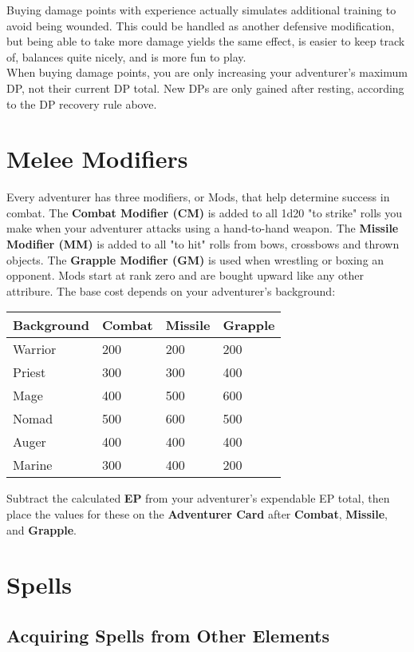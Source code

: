 \begin{multicols}{2}
Buying damage points with experience actually simulates additional training to avoid being wounded. This could be handled as another defensive modification, but being able to take more damage yields the same effect, is easier to keep track of, balances quite nicely, and is more fun to play.\\
When buying damage points, you are only increasing your adventurer’s maximum DP, not their current DP total. New DPs are only gained after resting, according to the DP recovery rule above.
\section{Melee Modifiers}
Every adventurer has three modifiers, or Mods, that help determine success in combat. The \textbf{Combat Modifier (CM)} is added to all 1d20 "to strike" rolls you make when
your adventurer attacks using a hand-to-hand weapon. The \textbf{Missile Modifier (MM)} is added to all "to hit" rolls from bows, crossbows and thrown objects. The \textbf{Grapple Modifier (GM)} is used when wrestling or boxing an opponent. Mods start at rank zero and are bought upward like any other attribure. The base cost depends on your adventurer’s background:

\begin{tcolorbox}[breakable,boxrule=0pt]
\begin{tabular}{l l l l}
\textbf{Background} & \textbf{Combat} & \textbf{Missile} & \textbf{Grapple}\\
\midrule
Warrior & 200 & 200 & 200\\
Priest & 300 & 300 & 400\\
Mage & 400 & 500 & 600\\
Nomad & 500 & 600 & 500\\
Auger & 400 & 400 & 400\\
Marine & 300 & 400 & 200\\
\end{tabular}
\end{tcolorbox}
Subtract the calculated \textbf{EP} from your adventurer’s expendable EP total, then place the values for these on the \textbf{Adventurer Card} after \textbf{Combat}, \textbf{Missile}, and \textbf{Grapple}.
\section{Spells}
\subsection{Acquiring Spells from Other Elements}

\end{multicols}
